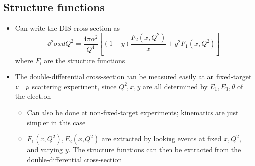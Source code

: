 \subsection{Structure functions}
\begin{itemize}
  \item Can write the DIS cross-section as
  \begin{equation}
    \dd{^2\sigma}{xdQ^2} = \frac{4\pi\alpha^2}{Q^4} \left[(1-y)\frac{F_2(x,Q^2)}{x}+y^2F_1(x,Q^2)\right]
  \end{equation}
  where $F_i$ are the structure functions
  \item The double-differential cross-section can be measured easily at an fixed-target $e^{-}~p$ scattering experiment, since $Q^2,x,y$ are all determined by $E_1, E_3,\theta$ of the electron 
  \begin{itemize}
    \item Can also be done at non-fixed-target experiments; kinematics are just simpler in this case
    \item $F_1(x,Q^2),F_2(x,Q^2)$ are extracted by looking events at fixed $x,Q^2$, and varying $y$. The structure functions can then be extracted from the double-differential cross-section
  \end{itemize}
\end{itemize}

